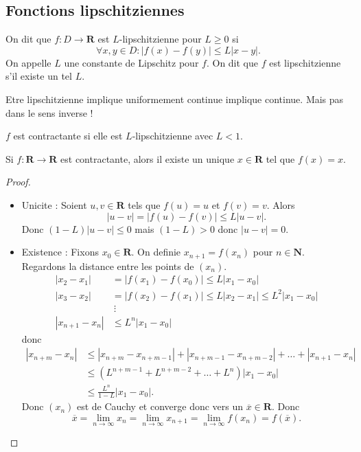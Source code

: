 
\subsection{Fonctions lipschitziennes}
\begin{definition}
On dit que $f:D\to \mathbf{R}$ est $L$-lipschitzienne pour $L\ge 0$ si 
$$
\forall x,y\in D:|f(x)-f(y)|\le L|x-y|.
$$
On appelle $L$ une constante de Lipschitz pour $f$. On dit que $f$ est lipschitzienne s'il existe un tel $L$.
\end{definition}
\begin{remark}
Etre lipschitzienne implique uniformement continue implique continue. Mais pas dans le sens inverse !
\end{remark}
\begin{definition}
$f$ est contractante si elle est $L$-lipschitzienne avec $L<1$. 
\end{definition}
\begin{theorem}
Si $f:\mathbf{R}\to \mathbf{R}$ est contractante, alors il existe un unique $x \in \mathbf{R}$ tel que $f(x)=x$.
\end{theorem}
\begin{proof}
\begin{itemize}
\item Unicite : Soient $u,v\in \mathbf{R}$ tels que $f(u)=u$ et $f(v)=v$. Alors
$$
|u-v|=|f(u)-f(v)|\le L|u-v|.
$$
Donc $(1-L)|u-v|\le 0$ mais $(1-L)>0$ donc $|u-v|=0$.
\item Existence : Fixons $x_{0}\in \mathbf{R}$. On definie $x_{n+1}=f(x_{n})$ pour $n\in \mathbf{N}$. Regardons la distance entre les points de $(x_{n})$. 
\begin{align*}
|x_{2}-x_{1}| & =|f(x_{1})-f(x_{0})|\le L|x_{1}-x_{0}| \\
|x_{3}-x_{2}| & =|f(x_{2})-f(x_{1})|\le L|x_{2}-x_{1}|\le L^{2}|x_{1}-x_{0}| \\
 & ~\vdots \\
 |x_{n+1}-x_{n}| &\le L^{n}|x_{1}-x_{0}| 
\end{align*}
donc 
\begin{align*}
|x_{n+m}-x_{n} | & \le |x_{n+m}-x_{n+m-1}|+|x_{n+m-1}-x_{n+m-2}|+\dots +|x_{n+1}-x_{n}| \\
&\le(L^{n+m-1}+L^{n+m-2}+\dots +L^{n})|x_{1}-x_{0}| \\
&\le \frac{L^{n}}{1-L}|x_{1}-x_{0}|.
\end{align*}
Donc $(x_{n})$ est de Cauchy et converge donc vers un $\overline{x}\in \mathbf{R}$. Donc
$$
\overline{x}=\lim_{ n \to \infty } x_{n}=\lim_{ n \to \infty }x_{n+1}=\lim_{ n \to \infty } f(x_{n})=f(\overline{x}).
$$
\end{itemize}
\end{proof}
